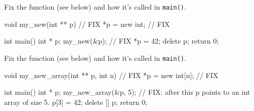 

\nextq
Fix the function (see below) and how it's called in \verb!main()!.
\\
\ANSWER
\begin{answercode}
void my_new(int ** p) // FIX
{
    *p = new int; // FIX
}

int main()
{
    int * p;
    my_new(&p); // FIX
    *p = 42;
    delete p;
    return 0;
}
\end{answercode}


\nextq
Fix the function (see below) and how it's called in \verb!main()!.
\\
\ANSWER
\begin{answercode}
void my_new_array(int ** p, int n) // FIX
{
    *p = new int[n]; // FIX
}

int main()
{
    int * p;
    my_new_array(&p, 5); // FIX: after this p points to an int array of size 5.
    p[3] = 42;
    delete [] p;
    return 0;
}
\end{answercode}


